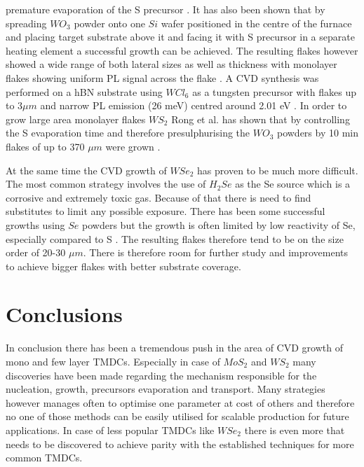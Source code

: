 premature evaporation of the S precursor \cite{doi:10.1021/nn4046002}. It has also been shown that by spreading $WO_3$ powder onto one $Si$ wafer positioned in the centre of the furnace and placing target substrate above it and facing it with S precursor in a separate heating element a successful growth can be achieved. The resulting flakes however showed a wide range of both lateral sizes as well as thickness with monolayer flakes showing uniform PL signal across the flake \cite{Cong2013}.  A CVD synthesis was performed on a hBN substrate using $WCl_6$ as a tungsten precursor with flakes up to $3 \mu m$ and narrow PL emission (26 meV) centred around 2.01 eV \cite{doi:10.1021/nn503093k}. In order to grow large area monolayer flakes $WS_2$ Rong et al. has shown that by controlling the S evaporation time and therefore presulphurising the $WO_3$ powders by 10 min flakes of up to 370 $\mu m$ were grown \cite{Rong2014}.

At the same time the CVD growth of $WSe_2$ has proven to be much more difficult. The most common strategy involves the use of $H_2Se$ as the Se source which is a corrosive and extremely toxic gas. Because of that there is need to find substitutes to limit any possible exposure. There has been some successful growths using $Se$ powders but the growth is often limited by low reactivity of Se, especially compared to S \cite{Ahn2017}\cite{Hsu2017}\cite{Li2015}. The resulting flakes therefore tend to be on the size order of 20-30 $\mu m$. There is therefore room for further study and improvements to achieve bigger flakes with better substrate coverage.

\section{Conclusions}

In conclusion there has been a tremendous push in the area of CVD growth of mono and few layer TMDCs. Especially in case of $MoS_2$ and $WS_2$ many discoveries have been made regarding the mechanism responsible for the nucleation, growth, precursors evaporation and transport. Many strategies however manages often to optimise one parameter at cost of others and therefore no one of those methods can be easily utilised for scalable production for future applications. In case of less popular TMDCs like $WSe_2$ there is even more that needs to be discovered to achieve parity with the established techniques for more common TMDCs.
